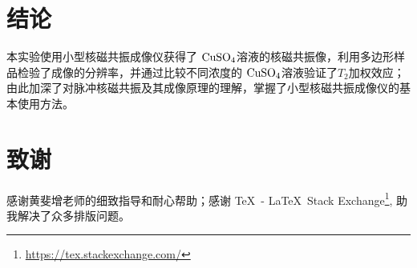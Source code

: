 \documentclass[aps,pre,12pt,preprint,%
	onecolumn,showpacs,showkeys,nofootinbib]{revtex4-1}
\newcommand{\cuSample}{$\mrm{CuSO_4}$溶液}
\begin{document}
\section{结论}
	本实验使用小型核磁共振成像仪获得了 \cuSample 的核磁共振像，利用多边形样品检验了成像的分辨率，并通过比较不同浓度的 \cuSample 验证了$T_2$加权效应；由此加深了对脉冲核磁共振及其成像原理的理解，掌握了小型核磁共振成像仪的基本使用方法。
\section{致谢}
	感谢黄斐增老师的细致指导和耐心帮助；感谢 \TeX\, - \LaTeX\, Stack Exchange\footnote{%
		\url{https://tex.stackexchange.com/}
	}, 助我解决了众多排版问题。
	
\vspace{1\baselineskip}

\setlength{\bibsep}{2pt}
\linespread{1.2}\selectfont



\clearpage
\end{document}

